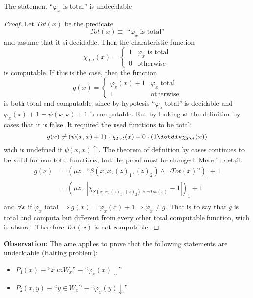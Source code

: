 \begin{theorem}
  The statement ``$\varphi_x$ is total'' is undecidable
  \begin{proof}
    Let $Tot(x)$ be the predicate
    \[ Tot(x) \equiv \mbox{ ``$\varphi_x$ is total''} \] and assume
    that it si decidable. Then the charateristic function
    \[
      \chi_{Tot}(x) = \begin{cases}
        1 & \varphi_x \mbox{ is total} \\
        0 & \mbox{otherwise}
      \end{cases}
    \]
    is computable. If this is the case, then the function
    \[
      g(x) = \begin{cases}
        \varphi_x (x) + 1 & \varphi_x \mbox{ total}\\
        1 & \mbox{otherwise}
      \end{cases}
    \]
    is both total and computable, since by hypotesis ``$\varphi_x$
    total'' is decidable and $\varphi_x(x) + 1 = \psi(x,x) + 1$ is
    computable. But by looking at the definition by cases that it is
    false. It required the used functions to be total:
    \[ g(x) \neq (\psi(x,x) + 1) \cdot \chi_{Tot}(x) + 0 \cdot (1
      \dotdiv \chi_{Tot}(x))\] wich is undefined if
    $\psi(x,x) \uparrow$. The theorem of definition by cases continues
    to be valid for non total functions, but the proof must be
    changed. More in detail:
    \[
      \begin{split}
        g(x) &= (\mu z \;.\; \mbox{``}S(x,x,(z)_1, (z)_2) \wedge \lnot Tot(x)\mbox{''})_1 + 1 \\
        &= (\mu z \;.\; | \chi_{S(x,x,(z)_1, (z)_2) \wedge \lnot Tot(x)} -  1|)_1 + 1 \\
      \end{split}
    \]
    and $\forall x$ if $\varphi_x$ total
    $\Rightarrow g(x) = \varphi_x(x) + 1 \Rightarrow \varphi_x \neq
    g$. That is to say that $g$ is total and computa but different
    from every other total computable function, wich is
    absurd. Therefore $Tot(x)$ is not computable.
  \end{proof}
\end{theorem}

\textbf{Observation:} The ame applies to prove that the following
statements are undecidable (Halting problem):
\begin{itemize}
\item
  $P_1(x) \equiv \mbox{``}x \ in W_x\mbox{''} \equiv
  \mbox{``}\varphi_x(x) \downarrow \mbox{''}$
\item
  $P_2(x,y) \equiv \mbox{``} y \in W_x \mbox{''} \equiv
  \mbox{``}\varphi_x(y) \downarrow\mbox{''}$
\end{itemize}

